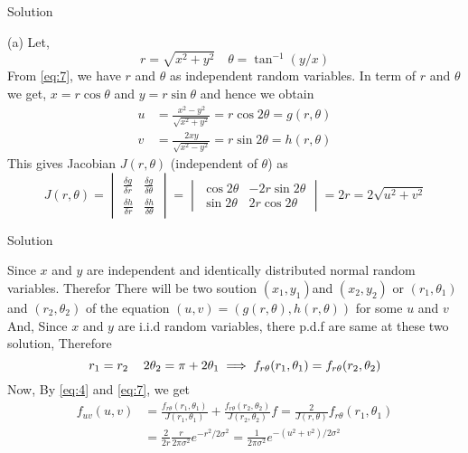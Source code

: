 \documentclass{beamer}
\begin{document}
\begin{frame}{Solution}
    \begin{block}{}
        (a) Let,
        \begin{equation}
            r=\sqrt{x^2+y^2} \hspace{12pt} \theta = \tan^{-1}(y/x)
        \end{equation}
        From \eqref{eq:7}, we have $r$ and $\theta$ as independent random variables. In term of $r$ and $\theta$ we get,
        $x=r\cos\theta$ and $y=r\sin\theta$ and hence we obtain
        \begin{align}
            u&=\frac{x^2-y^2}{\sqrt{x^2+y^2}} = r\cos 2\theta =g(r,\theta)\\
            v&=\frac{2xy}{\sqrt{x^2-y^2}} = r\sin 2\theta =h(r,\theta)
        \end{align}
        This gives Jacobian $J(r,\theta)$ (independent of $\theta$) as
        \begin{equation}
            J(r,\theta)= \begin{vmatrix}
                \frac{\delta g}{\delta r} & \frac{\delta g}{\delta \theta} \\ \frac{\delta h}{\delta r} & \frac{\delta h}{\delta \theta}
            \end{vmatrix} = \begin{vmatrix}
                \cos 2\theta & -2r\sin 2\theta \\ \sin 2\theta & 2r\cos 2\theta
            \end{vmatrix} = 2r = 2\sqrt{u^2+v^2}
        \end{equation}
    \end{block}
\end{frame} 
\begin{frame}{Solution}
    \begin{block}{}
        Since $x$ and $y$ are independent and identically distributed normal random variables. Therefor
        There will be two soution $(x_1,y_1)$and $(x_2,y_2)$ or $(r_1,\theta_1)$ and $(r_2,\theta_2)$ of the equation $(u,v) = (g(r,\theta),h(r,\theta))$ for some $u$ and $v$\\
        \bigskip
        And, Since $x$ and $y$ are i.i.d random variables, there p.d.f are same at these two solution, Therefore
        \begin{equation}
            r_1=r_2 \hspace*{12pt} 2\theta_2=\pi + 2\theta_1 \implies f_{r\theta}(r_1,\theta_1) = f_{r\theta}(r_2,\theta_2)
        \end{equation}
        Now, By \eqref{eq:4} and \eqref{eq:7}, we get
        \begin{align}
            f_{uv}(u,v) &= \frac{f_{r\theta}(r_1,\theta_1)}{J(r_1,\theta_1)}+\frac{f_{r\theta}(r_2,\theta_2)}{J(r_2,\theta_2)}f=\frac{2}{J(r,\theta)}f_{r\theta}(r_1,\theta_1) \\
            &= \frac{2}{2r}\frac{r}{2\pi\sigma^2}e^{-r^2/2\sigma^2}= \frac{1}{2\pi\sigma^2}e^{-(u^2+v^2)/2\sigma^2} \label{eq:14}
        \end{align}
    \end{block}
\end{frame}
\end{document}
